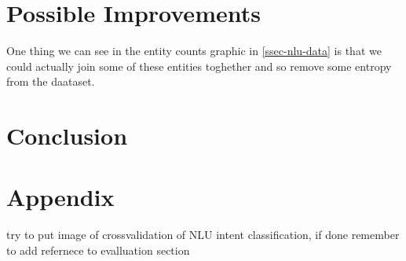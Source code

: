 \documentclass[11pt,a4paper]{article}
\begin{document}
\section{Possible Improvements}

	One thing we can see in the entity counts graphic in \ref{ssec-nlu-data} is that we could actually join some of these entities toghether and so remove some entropy from the daataset.

\section{Conclusion}
\label{sec-conclusion}
	
	
	
\section{Appendix}
\label{sec-appendix}
	
	try to put image of crossvalidation of NLU intent classification, if done remember to add refernece to evalluation section


%

%


%
\end{document}
